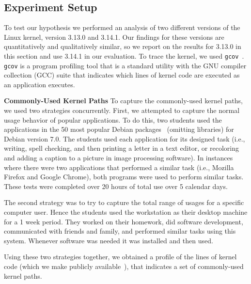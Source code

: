 \subsection{Experiment Setup}

To test our hypothesis we performed an analysis of two different versions of
the Linux kernel, version 3.13.0 and 3.14.1.  Our findings for these 
versions are quantitatively and qualitatively similar, so we report on 
the results for 3.13.0 in this section and use 3.14.1 in our evaluation.
To trace the kernel, we used \texttt{gcov}~\cite{gcov}.  
\texttt{gcov} is a program profiling
tool that is a standard utility with the GNU compiler collection
(GCC) suite that indicates which lines of kernel code are executed as an
application executes.

\textbf{Commonly-Used Kernel Paths}
To capture the commonly-used kernel paths, we used two strategies concurrently.
First, we attempted to capture the normal usage behavior of popular applications.
To do this, two students used the 
applications in the 50 most popular Debian packages~\cite{Top-Packages} 
(omitting libraries) for Debian version 7.0. 
The students used each application for its designed
task (i.e., writing, spell checking, and then printing a letter in a text
editor, or recoloring and adding a caption to a picture in image processing 
software). In instances where there were two applications that performed a 
similar task (i.e., Mozilla Firefox and Google Chrome), both programs were
used to perform similar tasks. These tests were completed over 20 hours of
total use over 5 calendar days. 

The second strategy was to try to capture the total range of usages for a 
specific computer user. Hence the students used the workstation as their
desktop machine for a 1 week period. They worked on their homework, did
software development, communicated with friends and family, and performed
similar tasks using this system. Whenever software was needed 
it was installed and then used.

Using these two strategies together, we obtained a profile of the lines of
kernel code (which we make publicly available~), that indicates
a set of commonly-used kernel paths.


